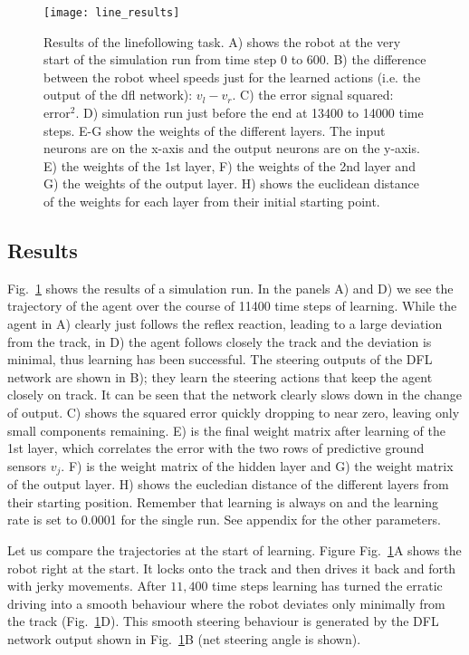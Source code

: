 \documentclass{llncs}
\begin{document}
\begin{figure}[h!]
  \centering
  \texttt{[image: line\_results]}
  \caption{Results of the linefollowing task. A) shows the robot at
    the very start of the simulation run from time step 0 to 600.
    B) the difference between the robot wheel speeds just for the learned
    actions (i.e. the output of the dfl network): $v_l-v_r$.
    C) the error signal squared: $\mathrm{error}^2$.
    D) simulation run just before the end at 13400 to 14000 time steps.
    E-G show the weights of the different layers. The input neurons are on the x-axis
    and the output neurons are on the y-axis.
    E) the weights of the 1st layer, F) the weights of the 2nd layer and
    G) the weights of the output layer.
        H) shows the euclidean distance of the weights for each layer from their initial starting point.
    \label{line_results}}
\end{figure}



\subsection{Results}
Fig.~\ref{line_results} shows the results of a simulation run. In the panels
A) and D) we see the trajectory of the agent over the course of 11400 time steps 
of learning. While the agent in A) clearly
just follows the reflex reaction, leading to a large deviation from the track,
in D) the agent follows closely the track and the deviation is minimal, thus
learning has been successful. The steering outputs of the DFL network are shown
in B); they learn the steering actions that keep the agent closely on track.
It can be seen that the network clearly slows down in the change of output.
C) shows the squared error quickly dropping to near zero, leaving only small 
components remaining. E) is the final weight matrix after learning of the 1st layer, 
which correlates the error with the two rows of
predictive ground sensors $v_j$. F) is the weight matrix of the hidden layer and G)
the weight matrix of the output layer. H) shows the eucledian distance of the
different layers from their starting position. Remember that learning is
always on and the learning rate is set to 0.0001 for the single run. See appendix
for the other parameters.

Let us compare the trajectories at the start of learning. Figure
Fig.~\ref{line_results}A shows the robot right at the start. It locks
onto the track and then drives it back and forth with jerky
movements. After $11,400$ time steps learning has turned the erratic
driving into a smooth behaviour where the robot deviates only
minimally from the track (Fig.~\ref{line_results}D). This smooth
steering behaviour is generated by the DFL network output 
shown in Fig.~\ref{line_results}B (net steering angle is shown).
\end{document}
